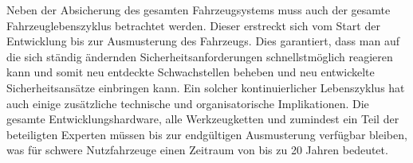 Neben der Absicherung des gesamten Fahrzeugsystems muss auch der 
gesamte Fahrzeuglebenszyklus betrachtet werden. Dieser erstreckt sich 
vom Start der Entwicklung bis zur Ausmusterung des Fahrzeugs. Dies garantiert, 
dass man auf die sich ständig ändernden Sicherheitsanforderungen schnellstmöglich 
reagieren kann und somit neu entdeckte Schwachstellen beheben und neu entwickelte 
Sicherheitsansätze einbringen kann.
\newline
Ein solcher kontinuierlicher Lebenszyklus hat auch einige zusätzliche technische 
und organisatorische Implikationen. Die gesamte Entwicklungshardware, alle 
Werkzeugketten und zumindest ein Teil der beteiligten Experten müssen bis zur endgültigen 
Ausmusterung verfügbar bleiben, was für schwere Nutzfahrzeuge einen Zeitraum
von bis zu 20 Jahren bedeutet.
